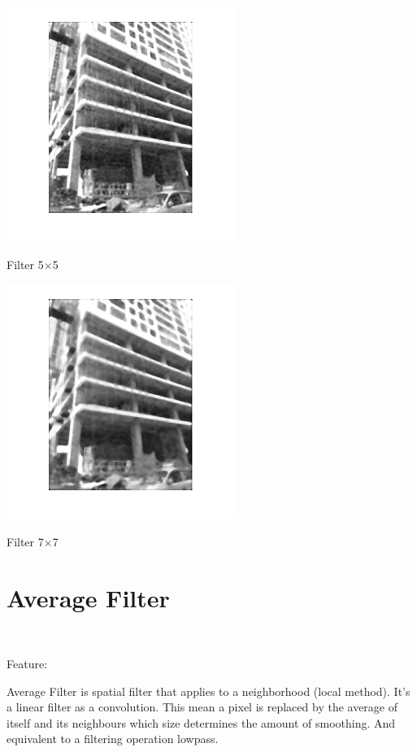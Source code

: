 \begin{center}
	\includegraphics{medianc5.png}

	Filter 5$\times$5
\end{center}
\newpage


\begin{center}
	\includegraphics{medianc7.png}
	
		Filter 7$\times$7
\end{center}
\section{Average Filter}

\

Feature: 

Average Filter is spatial filter that applies to a neighborhood (local method). It's a linear filter as a convolution. This mean a pixel is replaced by the average of itself and its neighbours which size determines the amount of smoothing. And equivalent to a filtering operation lowpass.


\

